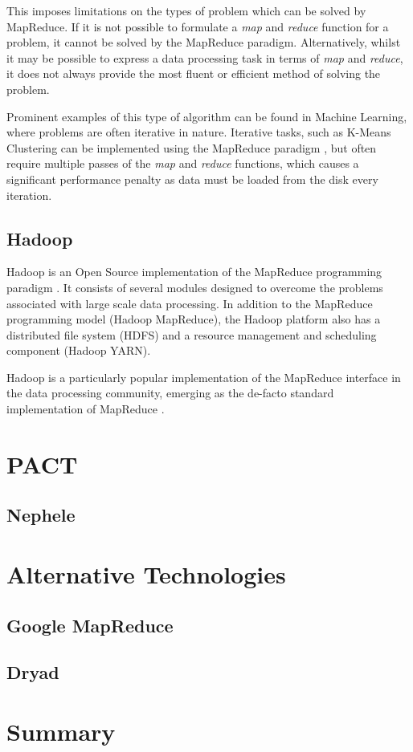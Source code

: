 This imposes limitations on the types of problem which can be solved by MapReduce. If it is not possible to formulate a \textit{map} and \textit{reduce} function for a problem, it cannot be solved by the MapReduce paradigm. Alternatively, whilst it may be possible to express a data processing task in terms of \textit{map} and \textit{reduce}, it does not always provide the most fluent or efficient method of solving the problem. 

Prominent examples of this type of algorithm can be found in Machine Learning, where problems are often iterative in nature. Iterative tasks, such as K-Means Clustering can be implemented using the MapReduce paradigm \cite{zhao2009parallel}, but often require multiple passes of the \textit{map} and \textit{reduce} functions, which causes a significant performance penalty as data must be loaded from the disk every iteration.

\subsection{Hadoop}
Hadoop is an Open Source implementation of the MapReduce programming paradigm \cite{hadoop}. It consists of several modules designed to overcome the problems associated with large scale data processing. In addition to the MapReduce programming model (Hadoop MapReduce), the Hadoop platform also has a distributed file system (HDFS) and a resource management and scheduling component (Hadoop YARN). 

Hadoop is a particularly popular implementation of the MapReduce interface in the data processing community, emerging as the de-facto standard implementation of MapReduce \cite{qin2013reflection}.
\section{PACT}

\subsection{Nephele}

\section{Alternative Technologies}

\subsection{Google MapReduce}
\subsection{Dryad}

\section{Summary}